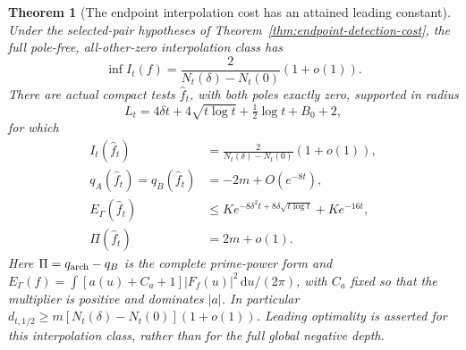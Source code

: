 \documentclass[11pt]{article}
\newtheorem{theorem}{Theorem}
\theoremstyle{remark}\newtheorem{remark}[theorem]{Remark}
\newcommand{\dd}{\,\mathrm d}
\begin{document}
\begin{theorem}[The endpoint interpolation cost has an attained leading constant]
\label{thm:endpoint-leading-cost}
Under the selected-pair hypotheses of
Theorem~\ref{thm:endpoint-detection-cost}, the full pole-free,
all-other-zero interpolation class has
\[
 \inf I_t(f)=\frac2{N_t(\delta)-N_t(0)}(1+o(1)).
                                                        \tag{EHL1}
\]
There are actual compact tests $\widehat f_t$, with both
poles exactly zero, supported in radius
\[
 L_t=4\delta t+4\sqrt{t\log t}
                         +\tfrac12\log t+B_0+2,
\]
for which
\[
 \begin{split}
 I_t(\widehat f_t)&=\frac2{N_t(\delta)-N_t(0)}(1+o(1)),\\
 q_A(\widehat f_t)=q_B(\widehat f_t)&=-2m+O(e^{-8t}),\\
 E_\Gamma(\widehat f_t)&\le
      K e^{-8\delta^2t+8\delta\sqrt{t\log t}}+K e^{-16t},\\
 \Pi(\widehat f_t)&=2m+o(1).
 \end{split}                                             \tag{EHL2}
\]
Here $\Pi=q_{\rm arch}-q_B$ is the complete prime-power
form and
$E_\Gamma(f)=\int[a(u)+C_a+1]|F_f(u)|^2\dd u/(2\pi)$,
with $C_a$ fixed so that the multiplier is positive and
dominates $|a|$.
In particular
$d_{t,1/2}\ge m[N_t(\delta)-N_t(0)](1+o(1))$.
Leading optimality is asserted for this interpolation
class, rather than for the full global negative depth.
\end{theorem}
\end{document}
